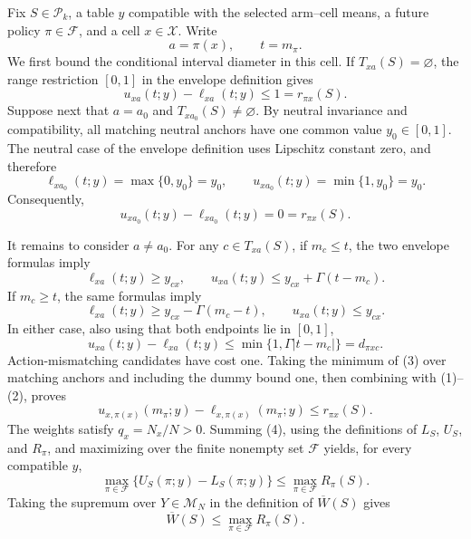 Fix \(S\in\mathcal P_k\), a table \(y\) compatible with the selected arm--cell means, a future policy \(\pi\in\mathcal F\), and a cell \(x\in\mathcal X\).  Write
\[
a=\pi(x),\qquad t=m_\pi.
\]
We first bound the conditional interval diameter in this cell.  If
\(T_{xa}(S)=\varnothing\), the range restriction \([0,1]\) in the envelope
definition gives
\[
u_{xa}(t;y)-\ell_{xa}(t;y)\leq 1=r_{\pi x}(S).                    \tag{1}
\]
Suppose next that \(a=a_0\) and \(T_{x a_0}(S)\neq\varnothing\).  By
neutral invariance and compatibility, all matching neutral anchors have one
common value \(y_0\in[0,1]\).  The neutral case of the envelope definition
uses Lipschitz constant zero, and therefore
\[
\ell_{x a_0}(t;y)=\max\{0,y_0\}=y_0,
\qquad
u_{x a_0}(t;y)=\min\{1,y_0\}=y_0.
\]
Consequently,
\[
u_{x a_0}(t;y)-\ell_{x a_0}(t;y)=0=r_{\pi x}(S).                 \tag{2}
\]

It remains to consider \(a\neq a_0\).  For any
\(c\in T_{xa}(S)\), if \(m_c\leq t\), the two envelope formulas imply
\[
\ell_{xa}(t;y)\geq y_{cx},
\qquad
u_{xa}(t;y)\leq y_{cx}+\Gamma(t-m_c).
\]
If \(m_c\geq t\), the same formulas imply
\[
\ell_{xa}(t;y)\geq y_{cx}-\Gamma(m_c-t),
\qquad
u_{xa}(t;y)\leq y_{cx}.
\]
In either case, also using that both endpoints lie in \([0,1]\),
\[
u_{xa}(t;y)-\ell_{xa}(t;y)
\leq \min\{1,\Gamma|t-m_c|\}=d_{\pi xc}.                         \tag{3}
\]
Action-mismatching candidates have cost one.  Taking the minimum of (3)
over matching anchors and including the dummy bound one, then combining
with (1)--(2), proves
\[
u_{x,\pi(x)}(m_\pi;y)-\ell_{x,\pi(x)}(m_\pi;y)
\leq r_{\pi x}(S).                                                \tag{4}
\]
The weights satisfy \(q_x=N_x/N>0\).  Summing (4), using the definitions of
\(L_S\), \(U_S\), and \(R_\pi\), and maximizing over the finite nonempty
set \(\mathcal F\) yields, for every compatible \(y\),
\[
\max_{\pi\in\mathcal F}
\{U_S(\pi;y)-L_S(\pi;y)\}
\leq \max_{\pi\in\mathcal F}R_\pi(S).
\]
Taking the supremum over \(Y\in\mathcal M_N\) in the definition of
\(\overline W(S)\) gives
\[
\overline W(S)\leq\max_{\pi\in\mathcal F}R_\pi(S).              \tag{5}
\]


